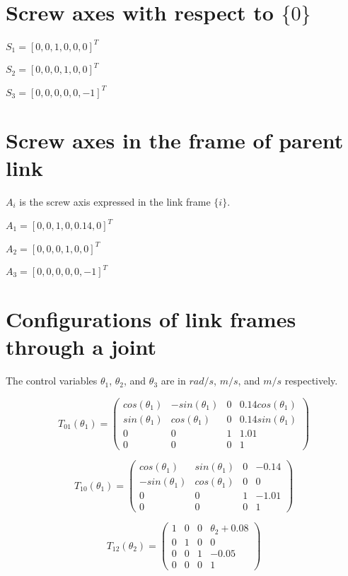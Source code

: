 \documentclass[]{scrreprt}
\begin{document}
\section{Screw axes with respect to $\{0\}$}

$S_1 = [0, 0, 1, 0 ,0, 0]^T$

$S_2 = [0,0,0,1,0,0]^T$

$S_3 = [0,0,0,0,0,-1]^T$

\section{Screw axes in the frame of parent link}

$A_i$ is the screw axis expressed in the link frame $\{i\}$.

$A_1 = [0,0,1,0,0.14,0]^T$

$A_2 = [0,0,0,1,0,0]^T$

$A_3 = [0,0,0,0,0,-1]^T$

\section{Configurations of link frames through a joint}

The control variables $\theta_1$, $\theta_2$, and $\theta_3$ are in $rad/s$, $m/s$, and $m/s$ respectively.

\[
T_{01}(\theta_1) = \left(\begin{array}{cccc}
cos(\theta_1) & -sin(\theta_1) & 0 & 0.14 cos(\theta_1)\\
sin(\theta_1) & cos(\theta_1) & 0 & 0.14 sin(\theta_1)\\
0 & 0 & 1 & 1.01\\
0 & 0 & 0 & 1
\end{array}\right)
\]

\[
T_{10}(\theta_1) = \left(\begin{array}{cccc}
cos(\theta_1) & sin(\theta_1) & 0 & -0.14\\
-sin(\theta_1) & cos(\theta_1) & 0 & 0\\
0 & 0 & 1 & -1.01\\
0 & 0 & 0 & 1
\end{array}\right)
\]

\[
T_{12}(\theta_2) = \left(\begin{array}{cccc}
1 & 0 & 0 & \theta_2+0.08\\
0 & 1 & 0 & 0\\
0 & 0 & 1 & -0.05\\
0 & 0 & 0 & 1
\end{array}\right)
\]
\end{document}
